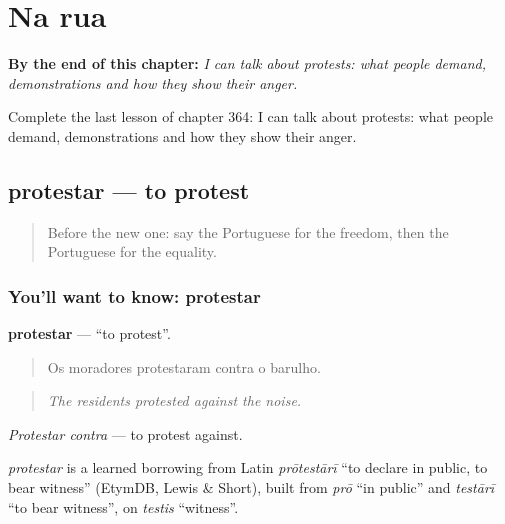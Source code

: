
\chapter{Na rua}
\label{ch:pt-na-rua}

\begin{chapteropening}
\textbf{By the end of this chapter:} \emph{I can talk about protests: what people demand, demonstrations and how they show their anger.}

Complete the last lesson of chapter 364: I can talk about protests: what people demand, demonstrations and how they show their anger.
\end{chapteropening}

\section[protestar]{protestar — to protest}

\label{lesson:PT-C364-protestar}



\begin{quote}
Before the new one: say the Portuguese for the freedom, then the Portuguese for the equality.
\end{quote}

\subsection*{You'll want to know: protestar}
\textbf{protestar} — \textquotedblleft{}to protest\textquotedblright{}.

\begin{quote}
Os moradores protestaram contra o barulho.
\end{quote}

\begin{quote}
\emph{The residents protested against the noise.}
\end{quote}

\emph{Protestar contra} — to protest against.

\begin{cousinweb}
\emph{protestar} is a learned borrowing from Latin \emph{prōtestārī} \textquotedblleft{}to declare in public, to bear witness\textquotedblright{} (EtymDB, Lewis \& Short), built from \emph{prō} \textquotedblleft{}in public\textquotedblright{} and \emph{testārī} \textquotedblleft{}to bear witness\textquotedblright{}, on \emph{testis} \textquotedblleft{}witness\textquotedblright{}.
\end{cousinweb}

